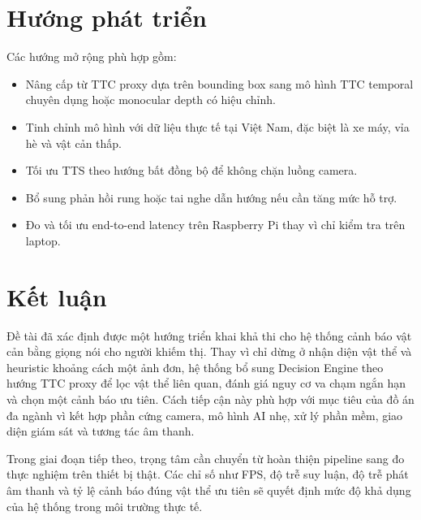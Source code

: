 \documentclass[twoside,final]{hcmut-report}
\begin{document}
\section{Hướng phát triển}

Các hướng mở rộng phù hợp gồm:
\begin{itemize}
  \item Nâng cấp từ TTC proxy dựa trên bounding box sang mô hình TTC temporal chuyên dụng hoặc monocular depth có hiệu chỉnh.
  \item Tinh chỉnh mô hình với dữ liệu thực tế tại Việt Nam, đặc biệt là xe máy, vỉa hè và vật cản thấp.
  \item Tối ưu TTS theo hướng bất đồng bộ để không chặn luồng camera.
  \item Bổ sung phản hồi rung hoặc tai nghe dẫn hướng nếu cần tăng mức hỗ trợ.
  \item Đo và tối ưu end-to-end latency trên Raspberry Pi thay vì chỉ kiểm tra trên laptop.
\end{itemize}

\section{Kết luận}

Đề tài đã xác định được một hướng triển khai khả thi cho hệ thống cảnh báo vật cản bằng giọng nói cho người khiếm thị. Thay vì chỉ dừng ở nhận diện vật thể và heuristic khoảng cách một ảnh đơn, hệ thống bổ sung Decision Engine theo hướng TTC proxy để lọc vật thể liên quan, đánh giá nguy cơ va chạm ngắn hạn và chọn một cảnh báo ưu tiên. Cách tiếp cận này phù hợp với mục tiêu của đồ án đa ngành vì kết hợp phần cứng camera, mô hình AI nhẹ, xử lý phần mềm, giao diện giám sát và tương tác âm thanh.

Trong giai đoạn tiếp theo, trọng tâm cần chuyển từ hoàn thiện pipeline sang đo thực nghiệm trên thiết bị thật. Các chỉ số như FPS, độ trễ suy luận, độ trễ phát âm thanh và tỷ lệ cảnh báo đúng vật thể ưu tiên sẽ quyết định mức độ khả dụng của hệ thống trong môi trường thực tế.



\end{document}
